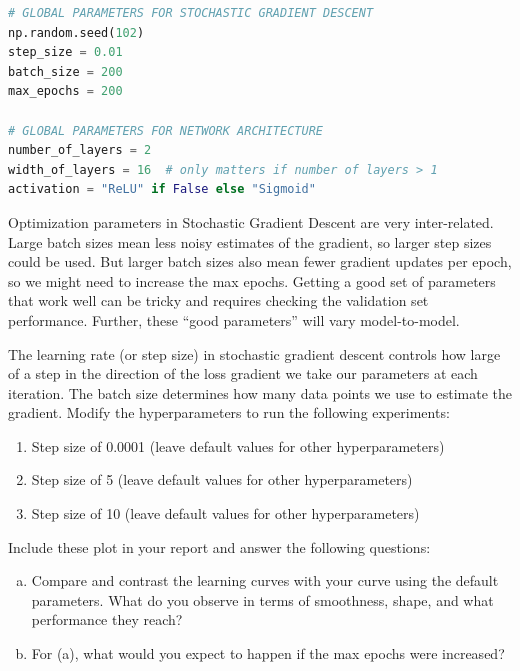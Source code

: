 \documentclass[a4paper,10pt]{article}
\begin{document}
\begin{center}
\begin{minipage}{0.9\textwidth}
\begin{lstlisting}[language=Python]
# GLOBAL PARAMETERS FOR STOCHASTIC GRADIENT DESCENT
np.random.seed(102)
step_size = 0.01
batch_size = 200
max_epochs = 200

# GLOBAL PARAMETERS FOR NETWORK ARCHITECTURE
number_of_layers = 2
width_of_layers = 16  # only matters if number of layers > 1
activation = "ReLU" if False else "Sigmoid" 
\end{lstlisting}
\end{minipage}
\end{center}


 Optimization parameters in Stochastic Gradient Descent are very inter-related. Large batch sizes mean less noisy estimates of the gradient, so larger step sizes could be used. But larger batch sizes also mean fewer gradient updates per epoch, so we might need to increase the max epochs. Getting a good set of parameters that work well can be tricky and requires checking the validation set performance. Further, these ``good parameters'' will vary model-to-model.


\begin{taskbox}
  The learning rate (or step size) in stochastic gradient descent controls how large of a step in the direction of the loss gradient we take our parameters at each iteration. The batch size determines how many data points we use to estimate the gradient. Modify the hyperparameters to run the following experiments:
\begin{enumerate}
    \item Step size of 0.0001 (leave default values for other hyperparameters)
    \item Step size of 5 (leave default values for other hyperparameters)
    \item Step size of 10 (leave default values for other hyperparameters)
\end{enumerate}
Include these plot in your report and answer the following questions:
\begin{enumerate}[a)]
\item Compare and contrast the learning curves with your curve using the default parameters. What do you observe in terms of smoothness, shape, and what performance they reach?
\item For (a), what would you expect to happen if the max epochs were increased?
\end{enumerate} 
\end{taskbox}
\end{document}
